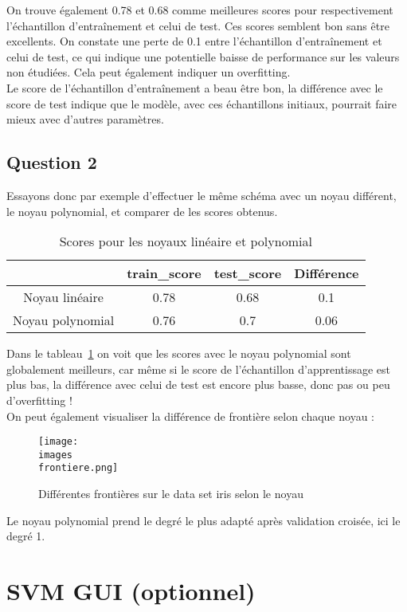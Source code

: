\documentclass[11pt,a4paper]{article}
\begin{document}
On trouve également 0.78 et 0.68 comme meilleures scores pour respectivement l'échantillon d'entraînement et celui de test. Ces scores semblent bon sans être excellents. On constate une perte de 0.1 entre l'échantillon d'entraînement et celui de test, ce qui indique une potentielle baisse de performance sur les valeurs non étudiées. Cela peut également indiquer un overfitting.\\
Le score de l'échantillon d'entraînement a beau être bon, la différence avec le score de test indique que le modèle, avec ces échantillons initiaux, pourrait faire mieux avec d'autres paramètres. 

\subsection*{Question 2}
Essayons donc par exemple d'effectuer le même schéma avec un noyau différent, le noyau polynomial, et comparer de les scores obtenus.
\begin{table}[H]
    \centering
    \begin{tabular}{|c|c|c|c|}
        \hline
        & train\_score & test\_score & Différence \\ 
        \hline
        Noyau linéaire & 0.78 & 0.68 & 0.1 \\
        \hline
        Noyau polynomial & 0.76 & 0.7 & 0.06 \\
        \hline
    \end{tabular}
    \caption{Scores pour les noyaux linéaire et polynomial}
    \label{Tableau 1}
\end{table}
Dans le tableau~\ref{Tableau 1} on voit que les scores avec le noyau polynomial sont globalement meilleurs, car même si le score de l'échantillon d'apprentissage est plus bas, la différence avec celui de test est encore plus basse, donc pas ou peu d'overfitting !\\
On peut également visualiser la différence de frontière selon chaque noyau : 
\begin{figure}[H]
    \centering
    \texttt{[image: \\images\\frontiere.png]}
    \caption{Différentes frontières sur le data set iris selon le noyau}
    \label{frontiere}
\end{figure}
Le noyau polynomial prend le degré le plus adapté après validation croisée, ici le degré 1.

\section*{SVM GUI (optionnel)}
\end{document}
